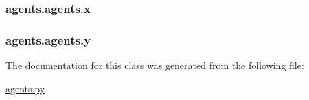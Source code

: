 \hypertarget{classagents_1_1agents_acbaa129398441280f50a0336800999fb}{
\subsubsection[{x}]{\setlength{\rightskip}{0pt plus 5cm}agents.\-agents.\-x}}\label{classagents_1_1agents_acbaa129398441280f50a0336800999fb}
\hypertarget{classagents_1_1agents_a680f80df9607786b2bc5e48946241b2c}{
\subsubsection[{y}]{\setlength{\rightskip}{0pt plus 5cm}agents.\-agents.\-y}}\label{classagents_1_1agents_a680f80df9607786b2bc5e48946241b2c}


The documentation for this class was generated from the following file\-:\begin{DoxyCompactItemize}
\item 
\hyperlink{agents_8py}{agents.\-py}\end{DoxyCompactItemize}
